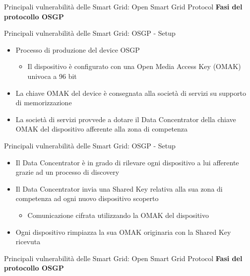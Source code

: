 \begin{frame}{Principali vulnerabilità delle Smart Grid: Open Smart Grid Protocol}
	\textbf{Fasi del protocollo OSGP}
\end{frame}

\begin{frame}{Principali vulnerabilità delle Smart Grid: OSGP - Setup}
	\begin{itemize}[<+- | alert@+>]
		\item Processo di produzione del device OSGP
		\begin{itemize}
			\item Il dispositivo è configurato con una Open Media Access Key (OMAK) univoca a 96 bit
		\end{itemize}
		\item La chiave OMAK del device è consegnata alla società di servizi su supporto di memorizzazione
		\item La società di servizi provvede a dotare il Data Concentrator della chiave OMAK del dispositivo afferente alla zona di competenza
	\end{itemize}
\end{frame}
\begin{frame}{Principali vulnerabilità delle Smart Grid: OSGP - Setup}
	\begin{itemize}[<+- | alert@+>]
		\item Il Data Concentrator è in grado di rilevare ogni dispositivo a lui afferente grazie ad un processo di discovery
		\item Il Data Concentrator invia una Shared Key relativa alla sua zona di competenza ad ogni nuovo dispositivo scoperto
		\begin{itemize}
			\item Comunicazione cifrata utilizzando la OMAK del dispositivo
		\end{itemize}
		\item Ogni dispositivo rimpiazza la sua OMAK originaria con la Shared Key ricevuta
	\end{itemize}
\end{frame}
\begin{frame}{Principali vulnerabilità delle Smart Grid: Open Smart Grid Protocol}
	\textbf{Fasi del protocollo OSGP}
\end{frame}


